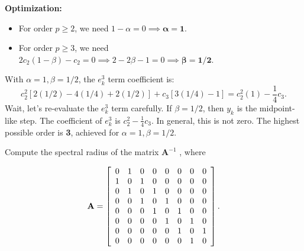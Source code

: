\begin{solution}
\textbf{Optimization:}
\begin{itemize}
    \item For order $p \geq 2$, we need $1-\alpha = 0 \implies \mathbf{\alpha = 1}$.
    \item For order $p \geq 3$, we need $2c_2(1-\beta) - c_2 = 0 \implies 2-2\beta-1=0 \implies \mathbf{\beta = 1/2}$.
\end{itemize}
With $\alpha=1, \beta=1/2$, the $e_k^3$ term coefficient is:
\[
c_2^2[2(1/2) - 4(1/4) + 2(1/2)] + c_3[3(1/4) - 1] = c_2^2(1) - \frac{1}{4}c_3.
\]
Wait, let's re-evaluate the $e_k^3$ term carefully. If $\beta=1/2$, then $y_k$ is the midpoint-like step.
The coefficient of $e_k^3$ is $c_2^2 - \frac{1}{4}c_3$. In general, this is not zero.
The highest possible order is \textbf{3}, achieved for $\alpha = 1, \beta = 1/2$.
\end{solution}

\begin{exercise}
\label{applied:2025:2}
Compute the spectral radius of the matrix $\mathbf { A } ^ { - 1 }$ , where

\[
\mathbf {A} = \left[ \begin{array}{c c c c c c c c} 0 & 1 & 0 & 0 & 0 & 0 & 0 & 0 \\ 1 & 0 & 1 & 0 & 0 & 0 & 0 & 0 \\ 0 & 1 & 0 & 1 & 0 & 0 & 0 & 0 \\ 0 & 0 & 1 & 0 & 1 & 0 & 0 & 0 \\ 0 & 0 & 0 & 1 & 0 & 1 & 0 & 0 \\ 0 & 0 & 0 & 0 & 1 & 0 & 1 & 0 \\ 0 & 0 & 0 & 0 & 0 & 1 & 0 & 1 \\ 0 & 0 & 0 & 0 & 0 & 0 & 1 & 0 \end{array} \right].
\]
\end{exercise}


